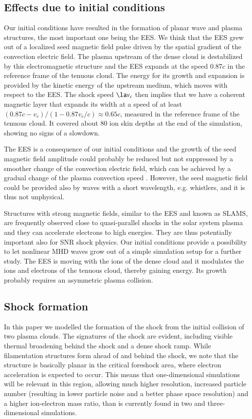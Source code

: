 \documentclass[structabstract]{aa}
\begin{document}
\subsection{Effects due to initial conditions}

Our initial conditions have resulted in the formation of planar wave and
plasma structures, the most important one being the EES. We think that the 
EES grew out of a localized seed magnetic field pulse driven by the spatial 
gradient of the convection electric field. The plasma upstream of the dense 
cloud is destabilized by this electromagnetic structure and the EES expands 
at the speed $0.87c$ in the reference frame of the tenuous cloud. The energy 
for its growth and expansion is provided by the kinetic energy of the 
upstream medium, which moves with respect to the EES. The shock speed 
$\la v_c$ then implies that we have a coherent magnetic layer that expands 
its width at a speed of at least $(0.87c-v_c)/(1-0.87 v_c / c) \approx 0.65c$, 
measured in the reference frame of the tenuous cloud. It covered about 80 ion 
skin depths at the end of the simulation, showing no signs of a slowdown. 

The EES is a consequence of our initial conditions and the growth of the 
seed magnetic field amplitude could probably be reduced but not suppressed 
by a smoother change of the convection electric field, which can be achieved 
by a gradual change of the plasma convection speed \citep{Oblique1,Oblique2}. 
However, the seed magnetic field could be provided also by waves with a short 
wavelength, e.g. whistlers, and it is thus not unphysical. 

Structures with strong magnetic fields, similar to the EES and known as SLAMS, 
are frequently observed close to quasi-parallel shocks in the solar system 
plasma and they can accelerate electrons to high energies. They are thus 
potentially important also for SNR shock physics. 
Our initial conditions provide a possibility to let nonlinear MHD waves grow 
out of a simple simulation setup for a further study. The EES is moving 
with the ions of the dense cloud and it modulates the ions and electrons 
of the tenuous cloud, thereby gaining energy. Its growth probably requires 
an asymmetric plasma collision. 

\subsection{Shock formation}

In this paper we modelled the formation of the shock from the initial 
collision of two plasma clouds. The signatures of the shock are evident, 
including visible thermal broadening behind the shock and a dense shock ramp. 
While filamentation structures form ahead of and behind the shock, we note 
that the structure is basically planar in the critical foreshock area, where 
electron acceleration is expected to occur. This means that one-dimensional 
simulations will be relevant in this region, allowing much higher resolution, 
increased particle number (resulting in lower particle noise and a better
phase space resolution) and a higher ion-electron mass ratio, than is 
currently found in two and three-dimensional simulations. 
\end{document}
